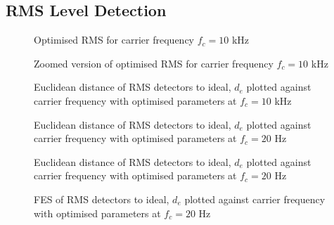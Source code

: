 \documentclass[../main2.tex]{subfiles}
\providecommand{\rootdir}{..}
\begin{document}
\subsection{RMS Level Detection}

\begin{figure}[h]
\centerline{}
\caption{Optimised RMS for carrier frequency $f_c=10$ kHz}
\label{fig:peak_det_opt_env_th_up}
\end{figure}

\begin{figure}[h]
\centerline{}
\caption{Zoomed version of optimised RMS for carrier frequency $f_c=10$ kHz}
\label{fig:peak_det_opt_env_fc_dep_th_up}
\end{figure}

\begin{figure}[h]
\centerline{}
\caption{Euclidean distance of RMS detectors to ideal, $d_e$ plotted against carrier frequency with optimised parameters at $f_c=10$ kHz}
\label{fig:rms_det_opt_env_fc10000_dep_error}
\end{figure}

\begin{figure}[h]
\centerline{}
\caption{Euclidean distance of RMS detectors to ideal, $d_e$ plotted against carrier frequency with optimised parameters at $f_c=20$ Hz}
\label{fig:rms_det_opt_env_fc20_dep_error}
\end{figure}

\begin{figure}[h]
\centerline{}
\caption{Euclidean distance of RMS detectors to ideal, $d_e$ plotted against carrier frequency with optimised parameters at $f_c=20$ Hz}
\label{fig:rms_det_opt_env_fc20_dep_error}
\end{figure}

\begin{figure}[h]
\centerline{}
\caption{FES of RMS detectors to ideal, $d_e$ plotted against carrier frequency with optimised parameters at $f_c=20$ Hz}
\label{fig:rms_det_opt_env_fc20_dep_fes}
\end{figure}
\end{document}
